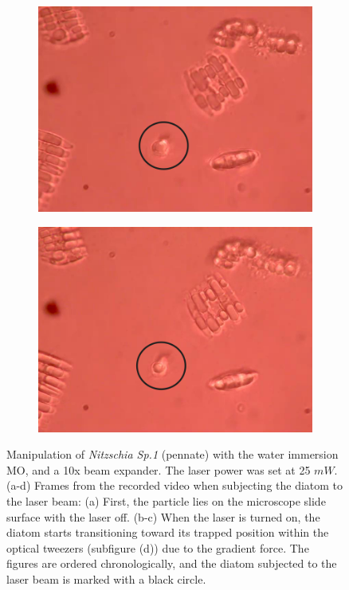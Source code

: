 \documentclass[letterpaper,12pt,oneside]{book}
\begin{document}
\begin{figure}[H]
\begin{subfigure}[b]{0.5\linewidth}
    \caption{}
    \label{fig7:b} 
    \vspace{4ex}
  \end{subfigure} 
  \begin{subfigure}[b]{0.5\linewidth}
    \centering
    \includegraphics[scale=0.3]{ResultadosAlgea1/3.png} 
    \caption{}
    \label{fig7:c} 
  \end{subfigure}%
  \begin{subfigure}[b]{0.5\linewidth}
    \centering
    \includegraphics[scale=0.3]{ResultadosAlgea1/1.png} 
    \caption{}
    \label{fig7:d} 
  \end{subfigure} 
  \caption{Manipulation of \textit{Nitzschia Sp.1} (pennate) with the water immersion MO, and a 10x beam expander. The laser power was set at 25 $mW$. (a-d) Frames from the recorded video when subjecting the diatom to the laser beam: (a) First, the particle lies on the microscope slide surface with the laser off. (b-c) When the laser is turned on, the diatom starts transitioning toward its trapped position within the optical tweezers (subfigure (d)) due to the gradient force. The figures are ordered chronologically, and the diatom subjected to the laser beam is marked with a black circle.}
  \label{WIMOFIRST1} 
\end{figure}
\end{document}
